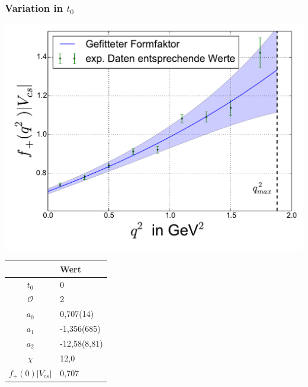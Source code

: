 \documentclass[hyperref={pdfpagelabels=false}]{beamer}
\begin{document}
\begin{frame}
 \frametitle{Variation in $t_0$}
 \begin{minipage}[h]{0.66\textwidth}
  \includegraphics[width=1.0\textwidth]{../Fit/D+-2O-0.pdf}
 \end{minipage}
 \begin{minipage}[h]{0.32\textwidth}
  \begin{table}[h]
   \begin{tabular}{c|l}
   \toprule
     & Wert\\
    \midrule
    $t_0$ & 0\\
    $\mathcal{O}$ & 2\\
    \midrule
    $a_0$ & 0,707(14)\\
    $a_1$ & -1,356(685)\\
    $a_2$ & -12,58(8,81)\\
    \midrule
    $\chi$ & 12,0\\
    $f_+(0)|V_{cs}|$ & 0,707\\
    \bottomrule\bottomrule
   \end{tabular}

  \end{table}

 \end{minipage}
\end{frame}
\end{document}
